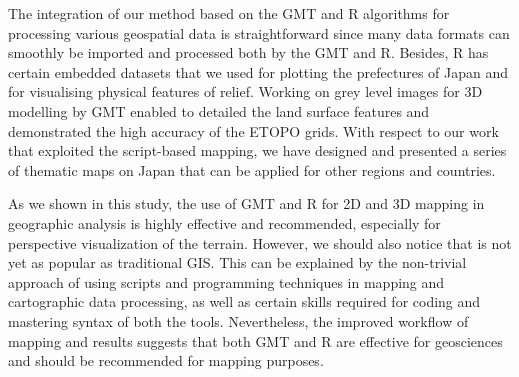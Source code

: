 \documentclass[land,article,submit,pdftex,moreauthors]{Definitions/mdpi}
\begin{document}
The integration of our method based on the GMT and R algorithms for processing various geospatial data is straightforward since many data formats can smoothly be imported and processed both by the GMT and R. Besides, R has certain embedded datasets that we used for plotting the prefectures of Japan and for visualising physical features of relief. Working on grey level images for 3D modelling by GMT enabled to detailed the land surface features and demonstrated the high accuracy of the ETOPO grids. With respect to our work that exploited the script-based mapping, we have designed and presented a series of thematic maps on Japan that can be applied for other regions and countries. 

As we shown in this study, the use of GMT and R for 2D and 3D mapping in geographic analysis is highly effective and recommended, especially for perspective visualization of the terrain. However, we should also notice that is not yet as popular as traditional GIS. This can be explained by the non-trivial approach of using scripts and programming techniques in mapping and cartographic data processing, as well as certain skills required for coding and mastering syntax of both the tools. Nevertheless, the improved workflow of mapping and results suggests that both GMT and R are effective for geosciences and should be recommended for mapping purposes.






\end{document}
